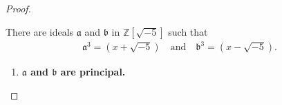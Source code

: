 \begin{proof}
\begin{enumerate}[resume]
    \end{enumerate}
    There are ideals \(\mathfrak{a}\) and \(\mathfrak{b}\) in \(\mathbb{Z}[\sqrt{-5}]\) such that
    \begin{align*}
        \mathfrak{a}^3 = (x + \sqrt{-5}) \quad \text{and} \quad \mathfrak{b}^3 = (x - \sqrt{-5}) \text{.}
    \end{align*}
    \begin{enumerate}[resume]
        \item \textbf{\(\mathfrak{a}\) and \(\mathfrak{b}\) are principal.}
    \end{enumerate}
\end{proof}